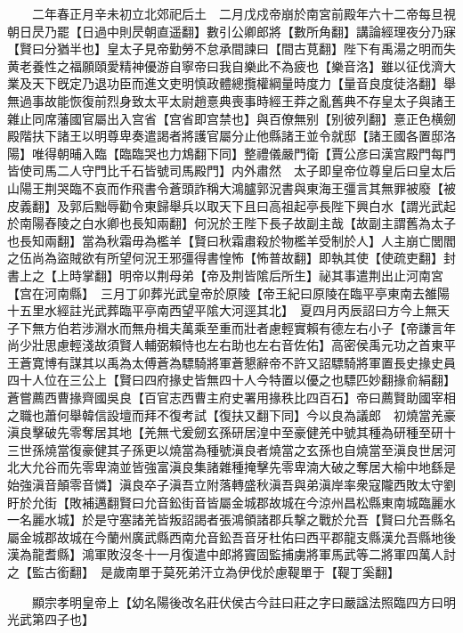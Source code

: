 　　二年春正月辛未初立北郊祀后土　二月戊戍帝崩於南宮前殿年六十二帝每旦視朝日昃乃罷【日過中則昃朝直遥翻】數引公卿郎將【數所角翻】講論經理夜分乃寐【賢曰分猶半也】皇太子見帝勤勞不怠承間諫曰【間古莧翻】陛下有禹湯之明而失黄老養性之福願頤愛精神優游自寧帝曰我自樂此不為疲也【樂音洛】雖以征伐濟大業及天下旣定乃退功臣而進文吏明慎政體總攬權綱量時度力【量音良度徒洛翻】舉無過事故能恢復前烈身致太平太尉趙憙典喪事時經王莽之亂舊典不存皇太子與諸王雜止同席藩國官屬出入宫省【宫省即宫禁也】與百僚無别【别彼列翻】憙正色横劒殿階扶下諸王以明尊卑奏遣謁者將護官屬分止他縣諸王並令就邸【諸王國各置邸洛陽】唯得朝晡入臨【臨臨哭也力鴆翻下同】整禮儀嚴門衛【賈公彦曰漢宫殿門每門皆使司馬二人守門比千石皆號司馬殿門】内外肅然　太子即皇帝位尊皇后曰皇太后　山陽王荆哭臨不哀而作飛書令蒼頭詐稱大鴻臚郭況書與東海王彊言其無罪被廢【被皮義翻】及郭后黜辱勸令東歸舉兵以取天下且曰高祖起亭長陛下興白水【謂光武起於南陽舂陵之白水卿也長知兩翻】何況於王陛下長子故副主哉【故副主謂舊為太子也長知兩翻】當為秋霜毋為檻羊【賢曰秋霜肅殺於物檻羊受制於人】人主崩亡閭閻之伍尚為盜賊欲有所望何況王邪彊得書惶怖【怖普故翻】即執其使【使疏吏翻】封書上之【上時掌翻】明帝以荆母弟【帝及荆皆隂后所生】祕其事遣荆出止河南宮【宫在河南縣】　三月丁卯葬光武皇帝於原陵【帝王紀曰原陵在臨平亭東南去雒陽十五里水經註光武葬臨平亭南西望平隂大河逕其北】　夏四月丙辰詔曰方今上無天子下無方伯若涉淵水而無舟楫夫萬乘至重而壯者慮輕實賴有德左右小子【帝謙言年尚少壯思慮輕淺故須賢人輔弼賴恃也左右助也左右音佐佑】高密侯禹元功之首東平王蒼寛博有謀其以禹為太傅蒼為驃騎將軍蒼懇辭帝不許又詔驃騎將軍置長史掾史員四十人位在三公上【賢曰四府掾史皆無四十人今特置以優之也驃匹妙翻掾俞絹翻】蒼嘗薦西曹掾齊國吳良【百官志西曹主府史署用掾秩比四百石】帝曰薦賢助國宰相之職也蕭何舉韓信設壇而拜不復考試【復扶又翻下同】今以良為議郎　初燒當羌豪滇良擊破先零奪居其地【羌無弋爰劒玄孫研居湟中至豪健羌中號其種為研種至研十三世孫燒當復豪健其子孫更以燒當為種號滇良者燒當之玄孫也自燒當至滇良世居河北大允谷而先零卑湳並皆強富滇良集諸雜種掩擊先零卑湳大破之奪居大榆中地繇是始強滇音顛零音憐】滇良卒子滇吾立附落轉盛秋滇吾與弟滇岸率衆寇隴西敗太守劉盱於允街【敗補邁翻賢曰允音鈆街音皆屬金城郡故城在今涼州昌松縣東南城臨麗水一名麗水城】於是守塞諸羌皆叛詔謁者張鴻領諸郡兵撃之戰於允吾【賢曰允吾縣名屬金城郡故城在今蘭州廣武縣西南允音鈆吾音牙杜佑曰西平郡龍支縣漢允吾縣地後漢為龍耆縣】鴻軍敗沒冬十一月復遣中郎將竇固監捕虜將軍馬武等二將軍四萬人討之【監古銜翻】　是歲南單于莫死弟汗立為伊伐於慮鞮單于【鞮丁奚翻】

　　顯宗孝明皇帝上【幼名陽後改名莊伏侯古今註曰莊之字曰嚴諡法照臨四方曰明光武第四子也】

